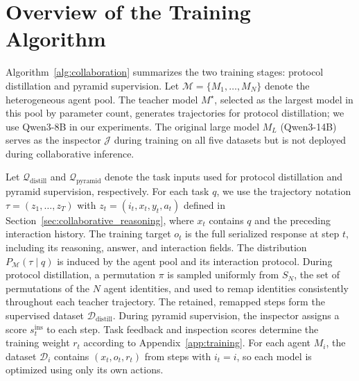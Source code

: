 \newcommand{\appendixHeading}[1]{\textcolor{appendixInk}{\textbf{#1}}}

\section{Overview of the Training Algorithm}
\label{app:algorithm}

Algorithm~\ref{alg:collaboration} summarizes the two training stages: protocol distillation and pyramid supervision. Let $\mathcal{M}=\{M_1,\ldots,M_N\}$ denote the heterogeneous agent pool. The teacher model $M^\star$, selected as the largest model in this pool by parameter count, generates trajectories for protocol distillation; we use Qwen3-8B in our experiments. The original large model $M_L$ (Qwen3-14B) serves as the inspector $\mathcal{J}$ during training on all five datasets but is not deployed during collaborative inference.

Let $\mathcal{Q}_{\mathrm{distill}}$ and $\mathcal{Q}_{\mathrm{pyramid}}$ denote the task inputs used for protocol distillation and pyramid supervision, respectively. For each task $q$, we use the trajectory notation $\tau=(z_1,\ldots,z_T)$ with $z_t=(i_t,x_t,y_t,a_t)$ defined in Section~\ref{sec:collaborative_reasoning}, where $x_t$ contains $q$ and the preceding interaction history. The training target $o_t$ is the full serialized response at step $t$, including its reasoning, answer, and interaction fields. The distribution $P_{\mathcal{M}}(\tau\mid q)$ is induced by the agent pool and its interaction protocol. During protocol distillation, a permutation $\pi$ is sampled uniformly from $S_N$, the set of permutations of the $N$ agent identities, and used to remap identities consistently throughout each teacher trajectory. The retained, remapped steps form the supervised dataset $\mathcal{D}_{\mathrm{distill}}$. During pyramid supervision, the inspector assigns a score $s_t^{\mathrm{ins}}$ to each step. Task feedback and inspection scores determine the training weight $r_t$ according to Appendix~\ref{app:training}. For each agent $M_i$, the dataset $\mathcal{D}_i$ contains $(x_t,o_t,r_t)$ from steps with $i_t=i$, so each model is optimized using only its own actions.

